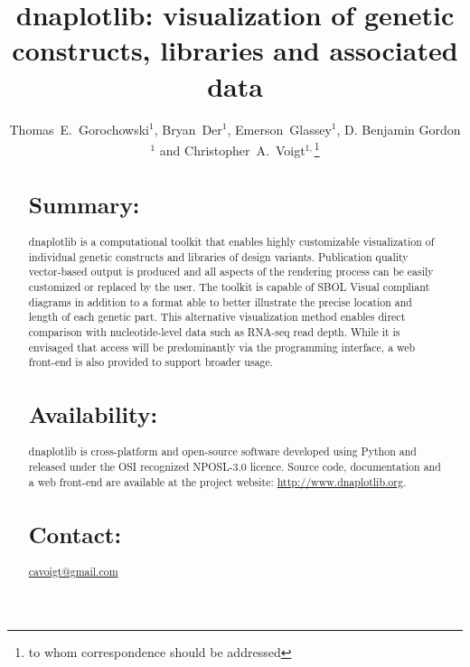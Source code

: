 \documentclass{bioinfo}
\begin{document}

\title[dnaplotlib]{dnaplotlib: visualization of genetic constructs, libraries and associated data}
\author[Thomas E. Gorochowski \textit{et~al.}]{Thomas~E.~Gorochowski$^{1}$, Bryan~Der$^{1}$, Emerson~Glassey$^{1}$, D. Benjamin Gordon$^{1}$ and Christopher~A.~Voigt$^{1,}$\footnote{to whom correspondence should be addressed}}
\address{$^{1}$Department of Biological Engineering, Synthetic Biology Center, Massachusetts Institute of Technology, USA.}




\maketitle

\begin{abstract}

\section{Summary:}
dnaplotlib is a computational toolkit that enables highly customizable visualization of individual genetic constructs and libraries of design variants. Publication quality vector-based output is produced and all aspects of the rendering process can be easily customized or replaced by the user. The toolkit is capable of SBOL Visual compliant diagrams in addition to a format able to better illustrate the precise location and length of each genetic part. This alternative visualization method enables direct comparison with nucleotide-level data such as RNA-seq read depth. While it is envisaged that access will be predominantly via the programming interface, a web front-end is also provided to support broader usage.

\section{Availability:}
dnaplotlib is cross-platform and open-source software developed using Python and released under the OSI recognized NPOSL-3.0 licence. Source code, documentation and a web front-end are available at the project website: \href{http://www.dnaplotlib.org}{http://www.dnaplotlib.org}.

\section{Contact:} \href{cavoigt@gmail.com}{cavoigt@gmail.com}
\end{abstract}
\end{document}

